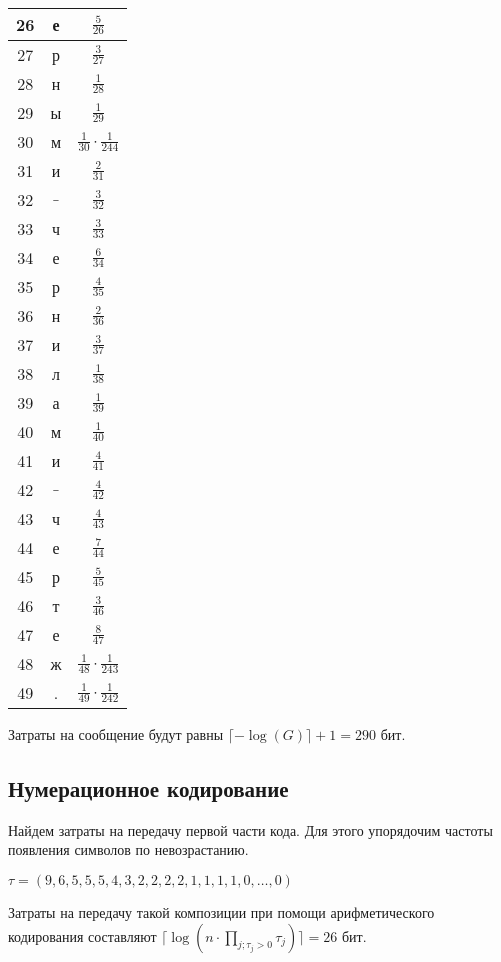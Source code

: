 \begin{tabular}{|c|c|c|}
\hline
26 & е & $\frac{5}{26}$\\
\hline
27 & р & $\frac{3}{27}$\\
\hline
28 & н & $\frac{1}{28}$\\
\hline
29 & ы & $\frac{1}{29}$\\
\hline
30 & м & $\frac{1}{30} \cdot \frac{1}{244}$\\
\hline
31 & и & $\frac{2}{31}$\\
\hline
32 & $\_$ & $\frac{3}{32}$\\
\hline
33 & ч & $\frac{3}{33}$\\
\hline
34 & е & $\frac{6}{34}$\\
\hline
35 & р & $\frac{4}{35}$\\
\hline
36 & н & $\frac{2}{36}$\\
\hline
37 & и & $\frac{3}{37}$\\
\hline
38 & л & $\frac{1}{38}$\\
\hline
39 & а & $\frac{1}{39}$\\
\hline
40 & м & $\frac{1}{40}$\\
\hline
41 & и & $\frac{4}{41}$\\
\hline
42 & $\_$ & $\frac{4}{42}$\\
\hline
43 & ч & $\frac{4}{43}$\\
\hline
44 & е & $\frac{7}{44}$\\
\hline
45 & р & $\frac{5}{45}$\\
\hline
46 & т & $\frac{3}{46}$\\
\hline
47 & е & $\frac{8}{47}$\\
\hline
48 & ж & $\frac{1}{48} \cdot \frac{1}{243}$\\
\hline
49 & . & $\frac{1}{49} \cdot \frac{1}{242}$\\
\hline
\end{tabular}

Затраты на сообщение будут равны $\lceil-\log(G)\rceil + 1 = 290$ бит.

\subsection{Нумерационное кодирование}

Найдем затраты на передачу первой части кода. Для этого упорядочим частоты появления символов по невозрастанию.

$\tau = (9, 6, 5, 5, 5, 4, 3, 2, 2, 2, 2, 1, 1, 1, 1, 0, \ldots, 0)$

Затраты на передачу такой композиции при помощи арифметического кодирования составляют
$\lceil\log(n \cdot \prod\limits_{j;\tau_j>0}\tau_j)\rceil = 26$ бит.

